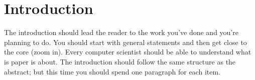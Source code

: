 \section{Introduction}\label{sec:introduction}

%
%
The introduction should lead the reader to the work you've done and you're
planning to do. You should start with general statements and then get close to the core (zoom in). Every computer scientist should be able to understand what is paper is about. The introduction should follow the same structure as the abstract; but this time you should spend one paragraph for each item.

